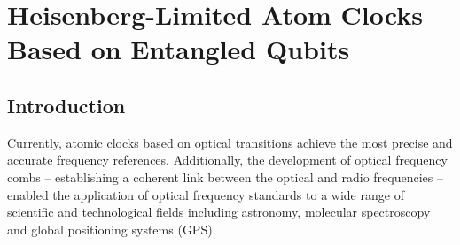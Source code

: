 \chapter{Heisenberg-Limited Atom Clocks Based on Entangled Qubits}
\label{ch:Kessler2014}

\section{Introduction}
Currently, atomic clocks based on optical transitions achieve the most
precise \cite{Nicholson2012, Bloom2013, Lemke2009} and accurate \cite{Chou2010,
Bloom2013} frequency references.
Additionally, the development of optical frequency combs
\cite{Eckstein1978, Reichert2000, Jones2000, Ye2003} -- establishing a coherent
link between the optical and radio frequencies -- enabled the application
of optical frequency standards to a wide range of scientific and technological
fields including astronomy, molecular spectroscopy and global
positioning systems (GPS).


